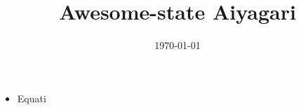 \documentclass[12pt]{article}
\begin{document}
\title{\textbf{Awesome-state Aiyagari}}
\date{\today }
\author{}
\maketitle

\begin{itemize}
\item Equati
\end{itemize}
\end{document}
